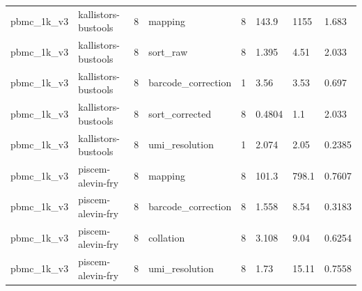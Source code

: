 \begin{tabular}{llllllll}
pbmc\_1k\_v3 & kallistors-bustools & 8 & mapping & 8 & 143.9 & 1155 & 1.683 \\
pbmc\_1k\_v3 & kallistors-bustools & 8 & sort\_raw & 8 & 1.395 & 4.51 & 2.033 \\
pbmc\_1k\_v3 & kallistors-bustools & 8 & barcode\_correction & 1 & 3.56 & 3.53 & 0.697 \\
pbmc\_1k\_v3 & kallistors-bustools & 8 & sort\_corrected & 8 & 0.4804 & 1.1 & 2.033 \\
pbmc\_1k\_v3 & kallistors-bustools & 8 & umi\_resolution & 1 & 2.074 & 2.05 & 0.2385 \\
pbmc\_1k\_v3 & piscem-alevin-fry & 8 & mapping & 8 & 101.3 & 798.1 & 0.7607 \\
pbmc\_1k\_v3 & piscem-alevin-fry & 8 & barcode\_correction & 8 & 1.558 & 8.54 & 0.3183 \\
pbmc\_1k\_v3 & piscem-alevin-fry & 8 & collation & 8 & 3.108 & 9.04 & 0.6254 \\
pbmc\_1k\_v3 & piscem-alevin-fry & 8 & umi\_resolution & 8 & 1.73 & 15.11 & 0.7558 \\
\bottomrule
\end{tabular}
